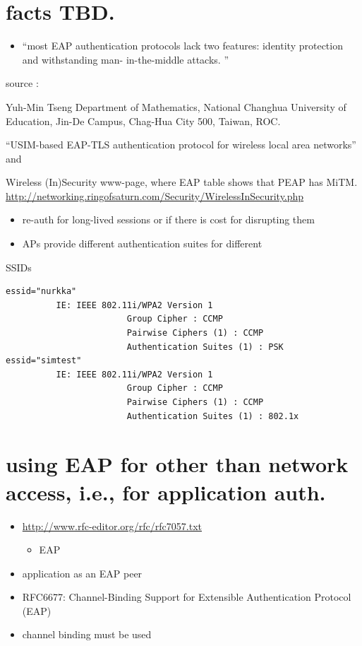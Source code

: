 \documentclass[12pt,a4paper,english]{tutthesis}
\begin{document}
\section{facts TBD.}
\label{sec-8-1}
\begin{itemize}
\item ``most EAP authentication protocols lack two features: identity
protection and withstanding man- in-the-middle attacks. ''
\end{itemize}
source :

Yuh-Min Tseng Department of Mathematics, National Changhua University of Education,
Jin-De Campus, Chag-Hua City 500, Taiwan, ROC.

``USIM-based EAP-TLS authentication protocol for
wireless local area networks''
and 

Wireless (In)Security www-page, where 
EAP table shows that PEAP has MiTM.
\url{http://networking.ringofsaturn.com/Security/WirelessInSecurity.php}

\begin{itemize}
\item re-auth for long-lived sessions or if there is cost for disrupting them
\item APs provide different authentication suites for different
\end{itemize}
SSIDs 

\scriptsize
\begin{verbatim}
essid="nurkka"
          IE: IEEE 802.11i/WPA2 Version 1
                        Group Cipher : CCMP
                        Pairwise Ciphers (1) : CCMP
                        Authentication Suites (1) : PSK
essid="simtest"
          IE: IEEE 802.11i/WPA2 Version 1
                        Group Cipher : CCMP
                        Pairwise Ciphers (1) : CCMP
                        Authentication Suites (1) : 802.1x
\end{verbatim}
\normalsize

\section{using EAP for other than network access, i.e., for application auth.}
\label{sec-8-2}
\begin{itemize}
\item \url{http://www.rfc-editor.org/rfc/rfc7057.txt}
\begin{itemize}
\item EAP
\end{itemize}
\item application as an EAP peer
\item RFC6677: Channel-Binding Support for Extensible Authentication Protocol (EAP)
\item channel binding must be used
\end{itemize}
\end{document}
